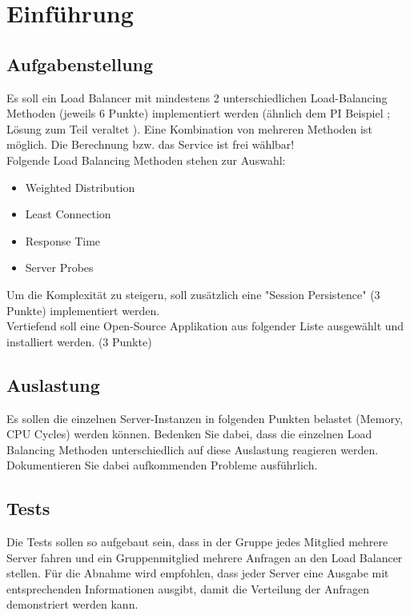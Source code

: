 \documentclass[letterpaper, 12pt]{article}
\let\tempsection\section
\renewcommand\section[1]{\vspace{-0.3cm}\tempsection{#1}\vspace{-0.3cm}}
\let\tempsubsection\subsection
\renewcommand\subsection[1]{\vspace{0cm}\tempsubsection{#1}\vspace{0cm}}
\begin{document}
\parindent 0pt
\parskip 6pt



\clearpage
\thispagestyle{empty}
\tableofcontents

\newpage
{}
\pagestyle{fancy}

\section{Einführung}
\subsection{Aufgabenstellung}
Es soll ein Load Balancer mit mindestens 2 unterschiedlichen Load-Balancing Methoden (jeweils 6 Punkte) implementiert werden (ähnlich dem PI Beispiel \cite{Angabe1}; Lösung zum Teil veraltet \cite{Angabe2}). Eine Kombination von mehreren Methoden ist möglich. Die Berechnung bzw. das Service ist frei wählbar! \\
Folgende Load Balancing Methoden stehen zur Auswahl:
\begin{itemize}
	\item Weighted Distribution
	\item Least Connection
	\item Response Time
	\item Server Probes
\end{itemize}
Um die Komplexität zu steigern, soll zusätzlich eine "Session Persistence" (3 Punkte) implementiert werden. \\
Vertiefend soll eine Open-Source Applikation aus folgender Liste ausgewählt und installiert werden. (3 Punkte) \cite{Angabe3}
\subsection{Auslastung}
Es sollen die einzelnen Server-Instanzen in folgenden Punkten belastet (Memory, CPU Cycles) werden können.
Bedenken Sie dabei, dass die einzelnen Load Balancing Methoden unterschiedlich auf diese Auslastung reagieren werden. Dokumentieren Sie dabei aufkommenden Probleme ausführlich.
\subsection{Tests}
Die Tests sollen so aufgebaut sein, dass in der Gruppe jedes Mitglied mehrere Server fahren und ein Gruppenmitglied mehrere Anfragen an den Load Balancer stellen. Für die Abnahme wird empfohlen, dass jeder Server eine Ausgabe mit entsprechenden Informationen ausgibt, damit die Verteilung der Anfragen demonstriert werden kann.
\end{document}
